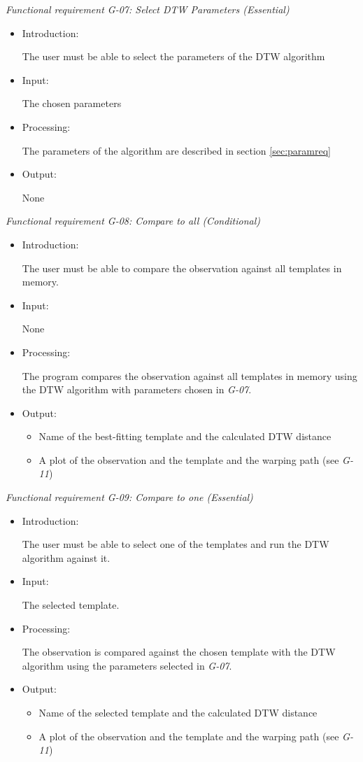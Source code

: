 \documentclass[a4paper,11pt]{article}
\begin{document}
\noindent \emph{Functional requirement G-07: Select DTW Parameters (Essential)}
\begin{itemize}
\item Introduction:

The user must be able to select the parameters of the DTW algorithm
\item Input:

The chosen parameters
\item Processing:

The parameters of the algorithm are described in section \ref{sec:paramreq}
\item Output:

None
\end{itemize}




\noindent \emph{Functional requirement G-08: Compare to all (Conditional)}
\begin{itemize}
\item Introduction:

The user must be able to compare the observation against all templates in memory.
\item Input:

None
\item Processing:

The program compares the observation against all templates in memory using the DTW algorithm with parameters chosen in
\emph{G-07}. 

\item Output:

\begin{itemize}
\item Name of the best-fitting template and the calculated DTW distance
\item A plot of the observation and the template and the warping path (see \emph{G-11})
\end{itemize}
\end{itemize}


\noindent \emph{Functional requirement G-09: Compare to one (Essential)}
\begin{itemize}
\item Introduction:

The user must be able to select one of the templates and run the DTW algorithm against it.
\item Input:
 
The selected template.
\item Processing:

The observation is compared against the chosen template with the DTW algorithm using the parameters selected in
\emph{G-07}.
\item Output:

\begin{itemize}
\item Name of the selected template and the calculated DTW distance
\item A plot of the observation and the template and the warping path (see \emph{G-11})
\end{itemize}
\end{itemize}
\end{document}
